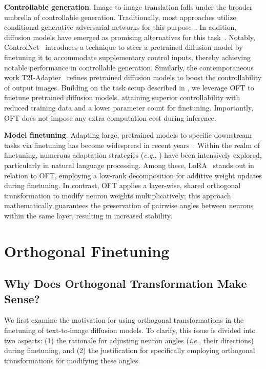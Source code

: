 \textbf{Controllable generation}. Image-to-image translation falls under the broader umbrella of controllable generation. Traditionally, most approaches utilize conditional generative adversarial networks for this purpose~\cite{isola2017image,zhu2017toward,wang2018high,park2019semantic,choi2018stargan}. In addition, diffusion models have emerged as promising alternatives for this task~\cite{saharia2022palette,voynov2022sketch,wang2022pretraining}. Notably, ControlNet~\cite{zhang2023adding} introduces a technique to steer a pretrained diffusion model by finetuning it to accommodate supplementary control inputs, thereby achieving notable performance in controllable generation. Similarly, the contemporaneous work T2I-Adapter~\cite{mou2023t2i} refines pretrained diffusion models to boost the controllability of output images. Building on the task setup described in \cite{zhang2023adding,mou2023t2i}, we leverage OFT to finetune pretrained diffusion models, attaining superior controllability with reduced training data and a lower parameter count for finetuning. Importantly, OFT does not impose any extra computation cost during inference.

\textbf{Model finetuning}. Adapting large, pretrained models to specific downstream tasks via finetuning has become widespread in recent years~\cite{devlin2018bert,brown2020language,he2022masked}. Within the realm of finetuning, numerous adaptation strategies (\emph{e.g.}, \cite{hulora2022,houlsby2019parameter,pfeiffer2020adapterfusion}) have been intensively explored, particularly in natural language processing. Among these, LoRA~\cite{hulora2022} stands out in relation to OFT, employing a low-rank decomposition for additive weight updates during finetuning. In contrast, OFT applies a layer-wise, shared orthogonal transformation to modify neuron weights multiplicatively; this approach mathematically guarantees the preservation of pairwise angles between neurons within the same layer, resulting in increased stability.

\section{Orthogonal Finetuning}

\subsection{Why Does Orthogonal Transformation Make Sense?}

We first examine the motivation for using orthogonal transformations in the finetuning of text-to-image diffusion models. To clarify, this issue is divided into two aspects: (1) the rationale for adjusting neuron angles (\emph{i.e.}, their directions) during finetuning, and (2) the justification for specifically employing orthogonal transformations for modifying these angles.

